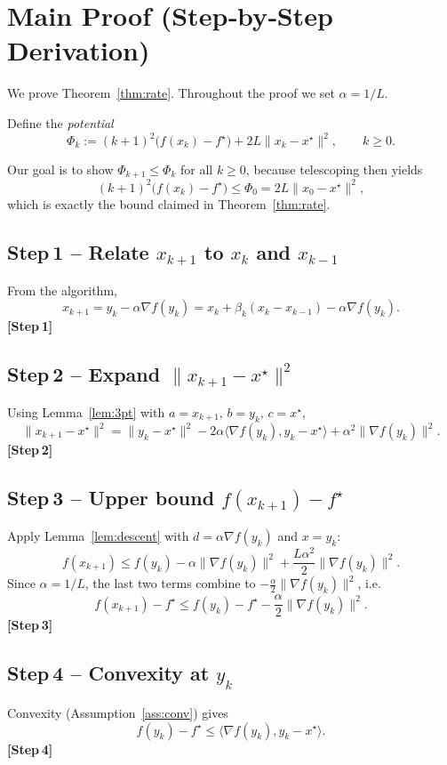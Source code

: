 \documentclass{article}
\begin{document}
\section*{Main Proof (Step‑by‑Step Derivation)}
We prove Theorem~\ref{thm:rate}. Throughout the proof we set $\alpha=1/L$.

Define the \emph{potential}
\[
\Phi_{k}:=(k+1)^{2}\bigl(f(x_{k})-f^{\star}\bigr)+2L\|x_{k}-x^{\star}\|^{2},
\qquad k\ge 0.
\tag{P}
\]

Our goal is to show $\Phi_{k+1}\le\Phi_{k}$ for all $k\ge0$, because telescoping then yields
\[
(k+1)^{2}\bigl(f(x_{k})-f^{\star}\bigr)\le\Phi_{0}=2L\|x_{0}-x^{\star}\|^{2},
\]
which is exactly the bound claimed in Theorem~\ref{thm:rate}.

\subsection*{Step 1 – Relate $x_{k+1}$ to $x_{k}$ and $x_{k-1}$}
From the algorithm,
\[
x_{k+1}=y_{k}-\alpha\nabla f(y_{k})
          =x_{k}+ \beta_{k}(x_{k}-x_{k-1})-\alpha\nabla f(y_{k}).
\tag{1}
\]
\textbf{[Step 1]}

\subsection*{Step 2 – Expand $\|x_{k+1}-x^{\star}\|^{2}$}
Using Lemma~\ref{lem:3pt} with $a=x_{k+1},\,b=y_{k},\,c=x^{\star}$,
\[
\|x_{k+1}-x^{\star}\|^{2}
 =\|y_{k}-x^{\star}\|^{2}
   -2\alpha\langle\nabla f(y_{k}),y_{k}-x^{\star}\rangle
   +\alpha^{2}\|\nabla f(y_{k})\|^{2}.
\tag{2}
\]
\textbf{[Step 2]}

\subsection*{Step 3 – Upper bound $f(x_{k+1})-f^{\star}$}
Apply Lemma~\ref{lem:descent} with $d=\alpha\nabla f(y_{k})$ and $x=y_{k}$:
\[
f(x_{k+1})\le f(y_{k})-\alpha\|\nabla f(y_{k})\|^{2}
            +\frac{L\alpha^{2}}{2}\|\nabla f(y_{k})\|^{2}.
\]
Since $\alpha=1/L$, the last two terms combine to $-\frac{\alpha}{2}\|\nabla f(y_{k})\|^{2}$, i.e.
\[
f(x_{k+1})-f^{\star}\le f(y_{k})-f^{\star}
                    -\frac{\alpha}{2}\|\nabla f(y_{k})\|^{2}.
\tag{3}
\]
\textbf{[Step 3]}

\subsection*{Step 4 – Convexity at $y_{k}$}
Convexity (Assumption~\ref{ass:conv}) gives
\[
f(y_{k})-f^{\star}\le\langle\nabla f(y_{k}),y_{k}-x^{\star}\rangle .
\tag{4}
\]
\textbf{[Step 4]}
\end{document}
